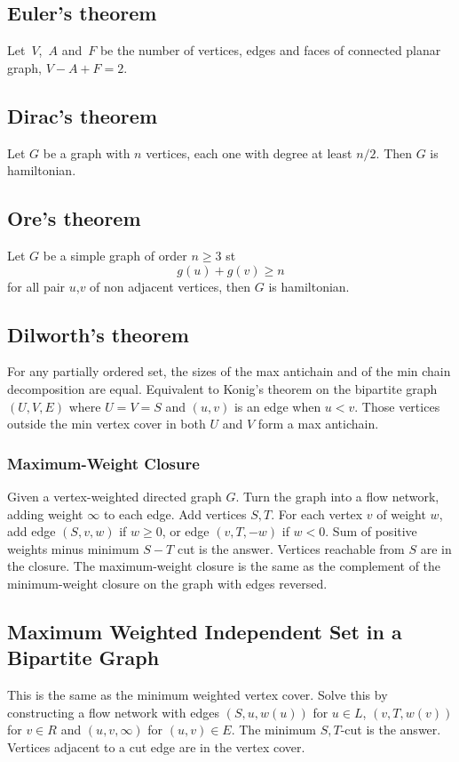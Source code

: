 \subsection{Euler's theorem}
Let~$V$,~$A$ and~$F$ be the number of vertices, edges and faces of connected planar graph,
$V - A + F = 2$.\\

\subsection{Dirac's theorem} Let $G$ be a graph with $n$ vertices, each one with degree at least $n/2$. Then $G$ is hamiltonian.\\

\subsection{Ore's theorem} Let $G$ be a simple graph of order $n \geq 3$ st
\[g(u) + g(v) \geq n \] for all pair $u$,$v$ of non adjacent vertices, then $G$ is hamiltonian.\\

\subsection{Dilworth's theorem}
For any partially ordered set, the sizes of the max antichain and of the min chain decomposition are equal. Equivalent to Konig's theorem on the bipartite graph $(U,V,E)$ where $U=V=S$ and $(u,v)$ is an edge when $u<v$. Those vertices outside the min vertex cover in both $U$ and $V$ form a max antichain.\\

\subsubsection{Maximum-Weight Closure}
Given a vertex-weighted directed graph $G$. Turn the graph into a flow
network, adding weight $\infty$ to each edge. Add vertices $S,T$. For
each vertex $v$ of weight $w$, add edge $(S,v,w)$ if $w\geq 0$, or edge
$(v,T,-w)$ if $w<0$. Sum of positive weights minus minimum $S-T$ cut is
the answer. Vertices reachable from $S$ are in the closure. The
maximum-weight closure is the same as the complement of the
minimum-weight closure on the graph with edges reversed.\\

\subsection{Maximum Weighted Independent Set in a Bipartite Graph}
This is the same as the minimum weighted vertex cover. Solve this by
constructing a flow network with edges $(S,u,w(u))$ for $u\in L$,
$(v,T,w(v))$ for $v\in R$ and $(u,v,\infty)$ for $(u,v)\in E$. The
minimum $S,T$-cut is the answer. Vertices adjacent to a cut edge are
in the vertex cover.\\

